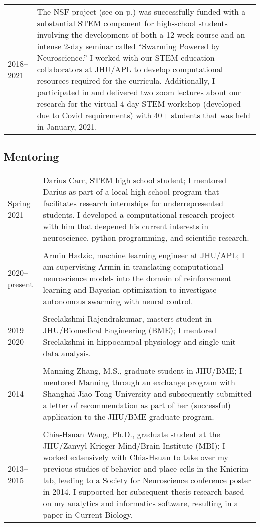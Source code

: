 \documentclass[10pt]{article}
\begin{document}
\begin{tabular}{@{\hspace{0.2in}}l>{\raggedright\arraybackslash}p{}}
  2018--2021 \hspace{0.1in} & The NSF project (see
  \emph{\nameref{sec:cursupport}} on p.\pageref{sec:cursupport}) was
  successfully funded with a substantial STEM component for high-school students
  involving the development of both a 12-week course and an intense 2-day
  seminar called ``Swarming Powered by Neuroscience.'' I worked with our STEM
  education collaborators at JHU/APL to develop computational resources required
  for the curricula. Additionally, I participated in and delivered two zoom
  lectures about our research for the virtual 4-day STEM workshop (developed due
  to Covid requirements) with 40+ students that was held in January, 2021.
\end{tabular}

\subsection*{Mentoring}

\begin{tabular}{@{\hspace{0.2in}}l>{\raggedright\arraybackslash}p{}}
  Spring 2021 & Darius Carr, STEM high school student; I mentored
  Darius as part of a local high school program that facilitates research
  internships for underrepresented students. I developed a computational
  research project with him that deepened his current interests in neuroscience,
  python programming, and scientific research. \\
  \tabularnewline
  2020--present \hspace{0.1in} & Armin Hadzic, machine learning engineer at JHU/APL; I
  am supervising Armin in translating computational neuroscience models into
  the domain of reinforcement learning and Bayesian optimization to investigate
  autonomous swarming with neural control. \\
  \tabularnewline
  2019--2020 & Sreelakshmi Rajendrakumar, masters student in
  JHU/Biomedical Engineering (BME); I mentored Sreelakshmi in hippocampal
  physiology and single-unit data analysis.\\
  \tabularnewline
  2014 & Manning Zhang, M.S., graduate student in JHU/BME; I mentored Manning
  through an exchange program with Shanghai Jiao Tong University and
  subsequently submitted a letter of recommendation as part of her (successful)
  application to the JHU/BME graduate program.\\
  \tabularnewline
  2013--2015 & Chia-Hsuan Wang, Ph.D., graduate student at the JHU/Zanvyl
  Krieger Mind/Brain Institute (MBI); I worked extensively with Chia-Hsuan to
  take over my previous studies of behavior and place cells in the Knierim lab,
  leading to a Society for Neuroscience conference poster in 2014. I supported
  her subsequent thesis research based on my analytics and informatics software,
  resulting in a paper in Current Biology.\\
\end{tabular}
\end{document}
